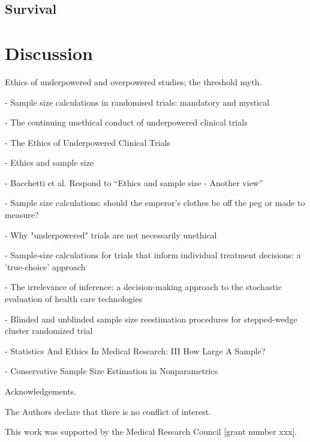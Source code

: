 \documentclass[sagev]{sagej}
\begin{document}
\subsection{Survival}

\section{Discussion}

Ethics of underpowered and overpowered studies; the threshold myth.

\cite{Schulz2005} - Sample size calculations in randomised trials: mandatory and mystical

\cite{Halpern2002} - The continuing unethical conduct of underpowered clinical trials

\cite{Lilford2002} - The Ethics of Underpowered Clinical Trials

\cite{Bacchetti2005a} - Ethics and sample size

\cite{Bacchetti2005} - Bacchetti et al. Respond to ``Ethics and sample size - Another view''

\cite{Norman2012} - Sample size calculations: should the emperor's clothes be off the peg or made to measure?

\cite{Edwards1997} - Why "underpowered" trials are not necessarily unethical

\cite{Girling2007} - Sample-size calculations for trials that inform individual treatment decisions: a 'true-choice' approach

\cite{Claxton1999} - The irrelevance of inference: a decision-making approach to the stochastic evaluation of health care technologies

\cite{Grayling2018} - Blinded and unblinded sample size reestimation procedures for stepped-wedge cluster randomized trial

\cite{Altman1980} - Statistics And Ethics In Medical Research: III How Large A Sample?

\cite{DeMartini2010} - Conservative Sample Size Estimation in Nonparametrics

\begin{acks}
Acknowledgements.
\end{acks}

\begin{dci}
The Authors declare that there is no conflict of interest.
\end{dci}

\begin{funding}
This work was supported by the Medical Research Council [grant number xxx].
\end{funding}



\end{document}
